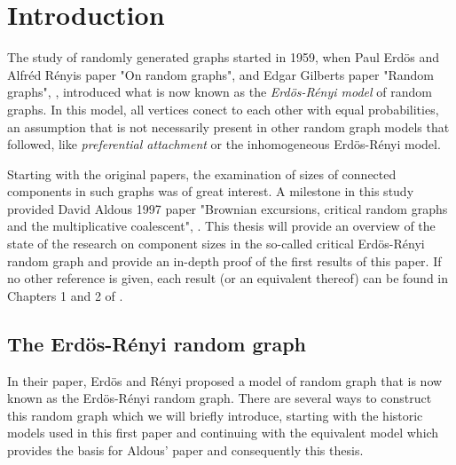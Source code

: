 
\chapter{Introduction}

The study of randomly generated graphs started in 1959,
when Paul Erdös and Alfréd Rényis paper "On random graphs", \cite{Erdos.1959}
and Edgar Gilberts paper "Random graphs", \cite{Gilbert.1959},
introduced what is now known as the \emph{Erdös-Rényi model} of random graphs.
In this model, all vertices conect to each other with equal probabilities,
an assumption that is not necessarily present in other random graph models that followed,
like \emph{preferential attachment} or the inhomogeneous Erdös-Rényi model.

Starting with the original papers,
the examination of sizes of connected components in such graphs was of great interest.
A milestone in this study provided David Aldous 1997 paper 
"Brownian excursions, critical random graphs and the multiplicative coalescent", \cite{Aldous.1997}.
This thesis will provide an overview of the state of the research on component sizes in the so-called
critical Erdös-Rényi random graph and provide an in-depth proof of the first results of this paper.
If no other reference is given, each result (or an equivalent thereof) can be found in Chapters 1 and 2 of \cite{Aldous.1997}.


\section{The Erdös-Rényi random graph}

In their paper, Erdös and Rényi proposed a model of random graph that is now known as the Erdös-Rényi random graph.
There are several ways to construct this random graph which we will briefly introduce,
starting with the historic models used in this first paper 
and continuing with the equivalent model which provides the basis for Aldous' paper and consequently this thesis.

